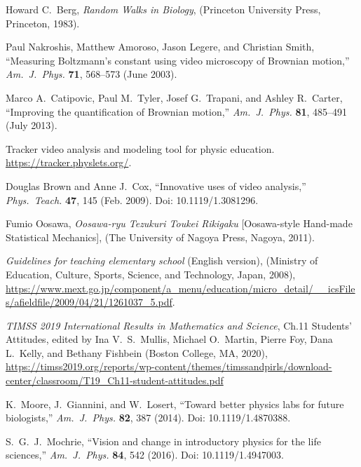 \documentclass[10pt, aps, prb, preprint, longbibliography, superscriptaddress]{revtex4-2}
\begin{document}
\begin{thebibliography}{99}
	Howard C.~Berg,
	\textit{Random Walks in Biology},
	(Princeton University Press, Princeton, 1983).

	Paul Nakroshis, Matthew Amoroso, Jason Legere, and Christian Smith,
	``Measuring Boltzmann's constant using video microscopy of Brownian motion,''
	\textit{Am.~J.~Phys.} \textbf{71}, 568--573 (June 2003).

	Marco A.~Catipovic, Paul M.~Tyler, Josef G.~Trapani, and Ashley R.~Carter,
	``Improving the quantification of Brownian motion,''
	\textit{Am.~J.~Phys.} \textbf{81}, 485--491 (July 2013).

	Tracker video analysis and modeling tool for physic education.
	\url{https://tracker.physlets.org/}.

	Douglas Brown and Anne J.~Cox, ``Innovative uses of video analysis,''
	\textit{Phys.~Teach.} \textbf{47}, 145 (Feb. 2009). Doi: 10.1119/1.3081296.

	Fumio Oosawa, \textit{Oosawa-ryu Tezukuri Toukei Rikigaku} [Oosawa-style Hand-made Statistical Mechanics],
	(The University of Nagoya Press, Nagoya, 2011).

	\textit{Guidelines for teaching elementary school} (English version),
	(Ministry of Education, Culture, Sports, Science, and Technology, Japan, 2008),
	\url{https://www.mext.go.jp/component/a_menu/education/micro_detail/__icsFiles/afieldfile/2009/04/21/1261037_5.pdf}.

	\textit{TIMSS 2019 International Results in Mathematics and Science}, Ch.11 Students' Attitudes,
	edited by Ina V.~S.~Mullis, Michael O.~Martin, Pierre Foy, Dana L.~Kelly, and Bethany Fishbein (Boston College, MA, 2020),
	\url{https://timss2019.org/reports/wp-content/themes/timssandpirls/download-center/classroom/T19_Ch11-student-attitudes.pdf}

	K.~Moore, J.~Giannini, and W.~Losert,
	``Toward better physics labs for future biologists,''
	\textit{Am.~J.~Phys.} \textbf{82}, 387 (2014). Doi: 10.1119/1.4870388.

	S.~G.~J.~Mochrie,
	``Vision and change in introductory physics for the life sciences,''
	\textit{Am.~J.~Phys.} \textbf{84}, 542 (2016). Doi: 10.1119/1.4947003.



\end{thebibliography}
\end{document}

